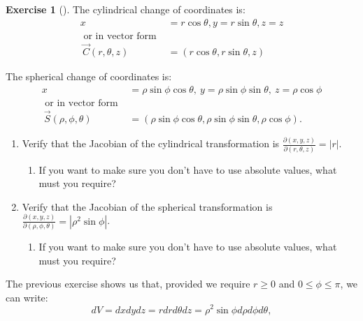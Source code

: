 \documentclass[10pt,]{book}
\theoremstyle{plain}
\theoremstyle{definition}
\theoremstyle{definition}
\theoremstyle{definition}
\theoremstyle{definition}
\newtheorem{exploration}[project]{Exercise}
\theoremstyle{definition}
\numberwithin{equation}{section}
\newcommand{\ds}{\displaystyle}
\newcommand{\amp}{&}
\begin{document}
\begin{exploration}[]\label{exploration-300}
The cylindrical change of coordinates is:%
\begin{align*}
x\amp =r\cos\theta, y=r\sin\theta, z=z\\
\text{ or in vector form } \amp \\\
\vec C(r,\theta,z) \amp = (r\cos\theta,r\sin\theta, z)
\end{align*}
%
\par
The spherical change of coordinates is:%
\begin{align*}
x\amp =\rho\sin\phi\cos\theta,\ y=\rho\sin\phi\sin\theta,\ z=\rho\cos\phi\\
\text{ or in vector form } \amp \\\
\vec S(\rho,\phi,\theta) \amp = (\rho\sin\phi\cos\theta,\rho\sin\phi\sin\theta,\rho\cos\phi).
\end{align*}
%
\begin{enumerate}[font=\bfseries,label=(\alph*),ref=\alph*]
\item\label{task-837} Verify that the Jacobian of the cylindrical transformation is \(\ds\frac{\partial(x,y,z)}{\partial(r,\theta,z)} = |r|\). \leavevmode%
\begin{itemize}[label=\textbullet]
\begin{enumerate}[font=\bfseries,label=(\alph*),ref=\alph*]
\item\label{task-838} If you want to make sure you don't have to use absolute values, what must you require?%
\end{enumerate}
\end{itemize}
%
\item\label{task-839} Verify that the Jacobian of the spherical transformation is \(\ds\frac{\partial(x,y,z)}{\partial(\rho,\phi,\theta)} = |\rho^2\sin\phi|\). \leavevmode%
\begin{itemize}[label=\textbullet]
\begin{enumerate}[font=\bfseries,label=(\alph*),ref=\alph*]
\item\label{task-840} If you want to make sure you don't have to use absolute values, what must you require?%
\end{enumerate}
\end{itemize}
%
\end{enumerate}
\end{exploration}
The previous exercise shows us that, provided we require \(r\geq0\) and \(0\leq \phi\leq \pi\), we can write:%
\begin{equation*}
dV=dxdydz = rdrd\theta dz = \rho^2\sin\phi d\rho d\phi d\theta,
\end{equation*}
\end{document}
